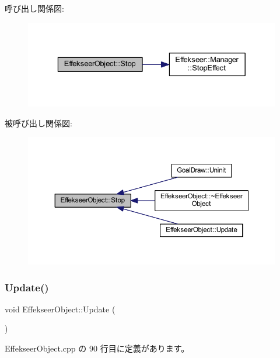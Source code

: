 呼び出し関係図\+:\nopagebreak
\begin{figure}[H]
\begin{center}
\leavevmode
\includegraphics[width=329pt]{class_effekseer_object_adfbdfbe202b78441b33d76656453e536_cgraph}
\end{center}
\end{figure}
被呼び出し関係図\+:\nopagebreak
\begin{figure}[H]
\begin{center}
\leavevmode
\includegraphics[width=350pt]{class_effekseer_object_adfbdfbe202b78441b33d76656453e536_icgraph}
\end{center}
\end{figure}
\mbox{\label{class_effekseer_object_aecb9314a5ff922c9420301129d2f26f7}} 
\subsubsection{\texorpdfstring{Update()}{Update()}}
{\footnotesize\ttfamily void Effekseer\+Object\+::\+Update (\begin{DoxyParamCaption}{ }\end{DoxyParamCaption})}



 Effekseer\+Object.\+cpp の 90 行目に定義があります。

